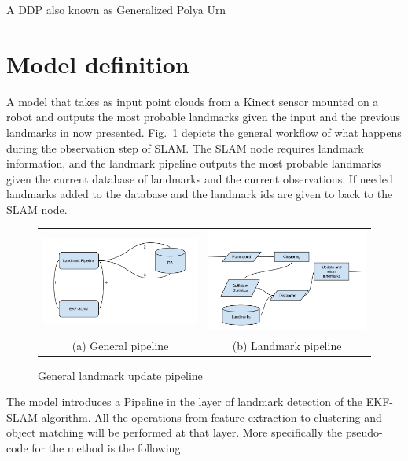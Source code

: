 \documentclass[twoside,hidelinks]{article}
\begin{document}
A DDP also known as Generalized Polya Urn


\section{Model definition}
\label{sec:model}

A model that takes as input point clouds from a Kinect sensor mounted on a robot and outputs the most probable landmarks given the input and the previous landmarks in now presented. Fig.~\ref{pipeline} depicts the general workflow of what happens during the observation step of SLAM. The SLAM node requires landmark information, and the landmark pipeline outputs the most probable landmarks given the current database of landmarks and the current observations. If needed landmarks added to the database and the landmark ids are given to back to the SLAM node.


\begin{figure}
\begin{tabular}{cc}
  \includegraphics[width=65mm]{workflowGen} &    \includegraphics[width=65mm]{workflowSpec} \\
(a) General pipeline & (b) Landmark pipeline \\[6pt]
\end{tabular}
\caption{General landmark update pipeline}
\label{pipeline}
\end{figure}

The model introduces a Pipeline in the layer of landmark detection of the EKF-SLAM algorithm. All the operations from feature extraction to clustering and object matching will be performed at that layer. More specifically the pseudo-code for the method is the following:
\end{document}
